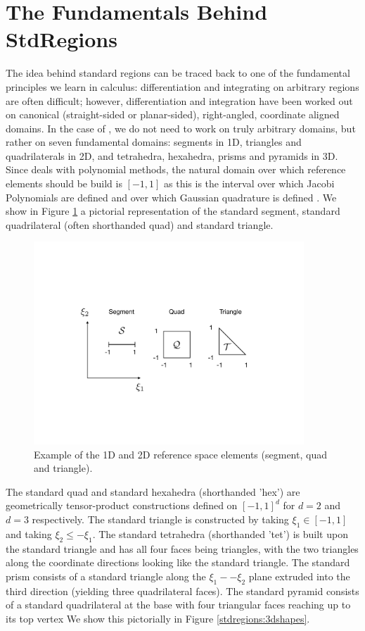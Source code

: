 %
\section{The Fundamentals Behind StdRegions}
\label{sec:stdregions-fundamentals}

The idea behind standard regions can be traced back to one of the fundamental principles we learn in calculus: differentiation and integrating
on arbitrary regions are often difficult; however, differentiation and integration have been worked out on canonical (straight-sided or planar-sided), 
right-angled, coordinate aligned domains.   In the case of {\nek}, we do not need to work on truly arbitrary domains, but rather on seven
fundamental domains:  segments in 1D, triangles and quadrilaterals in 2D, and tetrahedra, hexahedra, prisms and pyramids in 3D.  Since
{\nek} deals with polynomial methods, the natural domain over which reference elements should be build is $[-1,1]$ as this is the
interval over which Jacobi Polynomials are defined and over which Gaussian quadrature is defined \cite{CanutoHQZ87}.  We show in
Figure \ref{stdregions:refelement} a pictorial representation of the standard segment, standard quadrilateral (often shorthanded quad) and
standard triangle.  


\begin{figure}[htb]
\centering
\includegraphics[width=4in]{img/refelement.pdf}
\caption{Example of the 1D and 2D reference space elements (segment, quad and triangle).}
\label{stdregions:refelement}
\end{figure}

The standard quad and standard hexahedra (shorthanded 'hex') are geometrically tensor-product constructions defined
on $[-1,1]^d$ for $d=2$ and $d=3$ respectively.  The standard triangle is constructed by taking $\xi_1 \in [-1,1]$ and taking $\xi_2 \le -\xi_1$.
The standard tetrahedra (shorthanded 'tet') is built upon the standard triangle and has all four faces being triangles, with the two
triangles along the coordinate directions looking like the standard triangle.  The standard prism consists of a standard 
triangle along the $\xi_1--\xi_2$ plane extruded into the third direction (yielding three quadrilateral faces).  The standard
pyramid consists of a standard quadrilateral at the base with four triangular faces reaching up to its top vertex  We show this
pictorially in Figure \ref{stdregions:3dshapes}.


